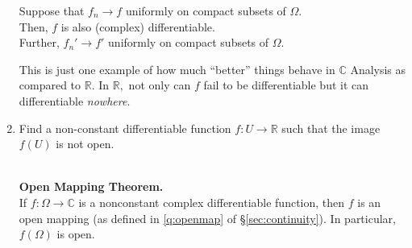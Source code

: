 \documentclass[12pt]{article}
\theoremstyle{definition}
\numberwithin{thm}{section}
\newenvironment{blockquote}
{\begin{mdframed}[skipabove=0pt, skipbelow=0pt, innertopmargin=4pt, innerbottommargin=4pt, bottomline=false,topline=false,rightline=false, linewidth=2pt]}
{\end{mdframed}}
\begin{document}
\begin{enumerate}
\begin{blockquote}
		Suppose that $f_n\to f$ uniformly on compact subsets of $\Omega.$\\
		Then, $f$ is also (complex) differentiable.\\
		Further, $f_n' \to f'$ uniformly on compact subsets of $\Omega.$
	\end{blockquote}
	This is just one example of how much ``better'' things behave in $\mathbb{C}$ Analysis as compared to $\mathbb{R}.$ In $\mathbb{R},$ not only can $f$ fail to be differentiable but it can differentiable \emph{nowhere}.
	\item Find a non-constant differentiable function $f:U\to \mathbb{R}$ such that the image $f(U)$ is not open.\\~\\
	\begin{blockquote}
		\textbf{Open Mapping Theorem.}\\
		If $f:\Omega \to \mathbb{C}$ is a nonconstant complex differentiable function, then $f$ is an open mapping (as defined in \ref{q:openmap} of \S\ref{sec:continuity}). In particular, $f(\Omega)$ is open.
	\end{blockquote}
\end{enumerate}
\end{document}
